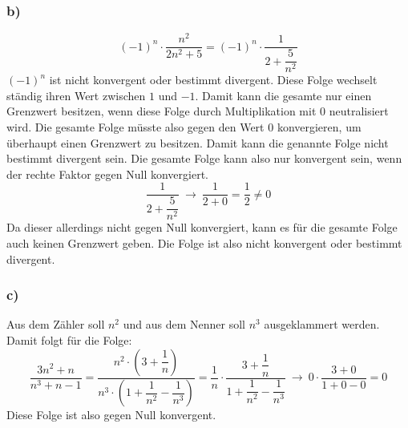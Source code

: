 \documentclass[10pt, a4paper]{article}
\begin{document}

		\subsubsection*{b)} %
		\label{ssub:b_}
		
			\[
				(-1)^n\cdot\dfrac{n^2}{2n^2+5} = (-1)^n\cdot \dfrac{1}{2+\dfrac{5}{n^2}}
			\]
			$(-1)^n$ ist nicht konvergent oder bestimmt divergent. Diese Folge wechselt ständig ihren Wert zwischen $1$ und $-1$. Damit kann die gesamte nur einen Grenzwert besitzen, wenn diese Folge durch Multiplikation mit $0$ neutralisiert wird. Die gesamte Folge müsste also gegen den Wert $0$ konvergieren, um überhaupt einen Grenzwert zu besitzen. Damit kann die genannte Folge nicht bestimmt divergent sein. Die gesamte Folge kann also nur konvergent sein, wenn der rechte Faktor gegen Null konvergiert. 
			\[
				\dfrac{1}{2+\dfrac{5}{n^2}} \ \longrightarrow \ \dfrac{1}{2+0} = \dfrac{1}{2} \neq 0
			\]
			Da dieser allerdings nicht gegen Null konvergiert, kann es für die gesamte Folge auch keinen Grenzwert geben. Die Folge ist also nicht konvergent oder bestimmt divergent.
			


		\subsubsection*{c)} %
		\label{ssub:c_}
			
			Aus dem Zähler soll $n^2$ und aus dem Nenner soll $n^3$ ausgeklammert werden. Damit folgt für die Folge:
			\[
				\dfrac{3n^2+n}{n^3+n-1} = \dfrac{n^2\cdot \left(3+\dfrac{1}{n}\right)}{n^3\cdot \left( 1+\dfrac{1}{n^2} -\dfrac{1}{n^3} \right)} = \dfrac{1}{n}\cdot\dfrac{3+\dfrac{1}{n}}{1+\dfrac{1}{n^2} -\dfrac{1}{n^3}} \ \longrightarrow \ 0\cdot\dfrac{3+0}{1+0-0} = 0
			\]
			Diese Folge ist also gegen Null konvergent.

		
		\newpage


\end{document}
